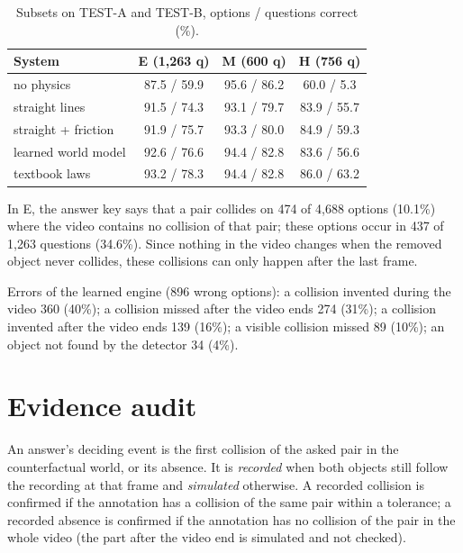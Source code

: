 \begin{table}[h]
\caption{Subsets on TEST-A and TEST-B, options / questions correct (\%).}
\label{tab:subsets}
\centering
\small
\begin{tabular}{@{}lccc@{}}
\toprule
System & E (1,263 q) & M (600 q) & H (756 q) \\
\midrule
no physics & 87.5 / 59.9 & 95.6 / 86.2 & 60.0 / 5.3 \\
straight lines & 91.5 / 74.3 & 93.1 / 79.7 & 83.9 / 55.7 \\
straight + friction & 91.9 / 75.7 & 93.3 / 80.0 & 84.9 / 59.3 \\
learned world model & 92.6 / 76.6 & 94.4 / 82.8 & 83.6 / 56.6 \\
textbook laws & 93.2 / 78.3 & 94.4 / 82.8 & 86.0 / 63.2 \\
\bottomrule
\end{tabular}
\end{table}

In E, the answer key says that a pair collides on 474 of 4,688 options (10.1\%) where the video contains no collision of that pair; these options occur in 437 of 1,263 questions (34.6\%).
Since nothing in the video changes when the removed object never collides, these collisions can only happen after the last frame.

Errors of the learned engine (896 wrong options): a collision invented during the video 360 (40\%); a collision missed after the video ends 274 (31\%); a collision invented after the video ends 139 (16\%); a visible collision missed 89 (10\%); an object not found by the detector 34 (4\%).

\section{Evidence audit}
\label{app:events}

An answer's deciding event is the first collision of the asked pair in the counterfactual world, or its absence.
It is \emph{recorded} when both objects still follow the recording at that frame and \emph{simulated} otherwise.
A recorded collision is confirmed if the annotation has a collision of the same pair within a tolerance; a recorded absence is confirmed if the annotation has no collision of the pair in the whole video (the part after the video end is simulated and not checked).

